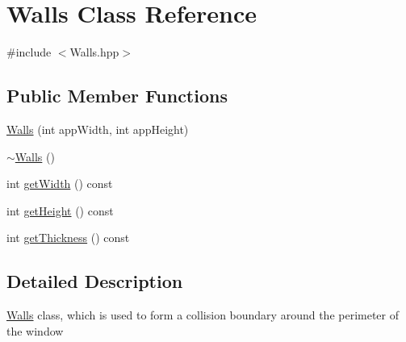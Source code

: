 \hypertarget{classWalls}{\section{Walls Class Reference}
\label{classWalls}
}


{\ttfamily \#include $<$Walls.\-hpp$>$}

\subsection*{Public Member Functions}
\begin{DoxyCompactItemize}
\item 
\hyperlink{classWalls_a8c5996222aa9dad4af6528d88110fd28}{Walls} (int app\-Width, int app\-Height)
\item 
\hyperlink{classWalls_a1136e53ddf2cc39aa354e9a02ec98f43}{$\sim$\-Walls} ()
\item 
int \hyperlink{classWalls_a360fb70538bfd72d05ba9b011ac4f7bb}{get\-Width} () const 
\item 
int \hyperlink{classWalls_a696765c4b969fbe387d03d7c469c6e16}{get\-Height} () const 
\item 
int \hyperlink{classWalls_a7b781a5d6151546dfcdde4981f44f0c9}{get\-Thickness} () const 
\end{DoxyCompactItemize}


\subsection{Detailed Description}
\hyperlink{classWalls}{Walls} class, which is used to form a collision boundary around the perimeter of the window 

